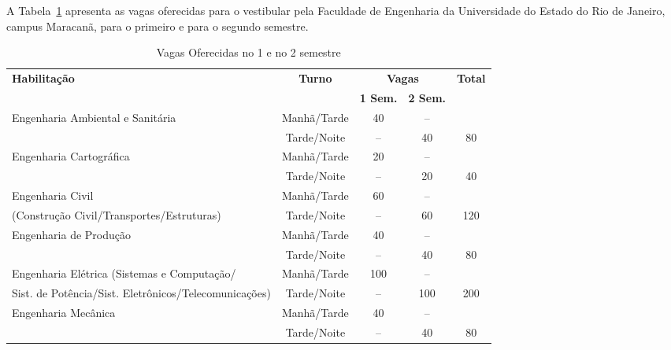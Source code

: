 A Tabela~\ref{tabvagas} apresenta as vagas oferecidas para o vestibular pela Faculdade de Engenharia da Universidade do Estado do Rio de Janeiro, campus Maracanã, para o primeiro e para o segundo semestre.
\setlength{\tabcolsep}{5pt}
\begin{table}
\centering
\caption{Vagas Oferecidas no 1\textordmasculine{} e no 2\textordmasculine{} semestre}
\label{tabvagas}
\renewcommand{\arraystretch}{1.5}
  \begin{tabularx}{\textwidth}{|X|c|c|c|c|}
	\hline
	\multirow{2}{*}{\textbf{Habilitação}}& \multirow{2}{*}{\textbf{Turno}} & \multicolumn{2}{c|}{\textbf{Vagas}} & \multirow{2}{*}{\textbf{Total}}\\
	\cline{3-4}& & \textbf{1\textordmasculine{} Sem.}                     & \textbf{2\textordmasculine{} Sem.}                &     \\
		\hline
		Engenharia Ambiental e Sanitária & Manhã/Tarde & 40 & --&     \\
		                                 & Tarde/Noite & -- & 40 & 80 \\
		\hline
		Engenharia Cartográfica          & Manhã/Tarde & 20 & -- &    \\
		                                 & Tarde/Noite & -- & 20 & 40 \\
		\hline
		Engenharia Civil                 & Manhã/Tarde & 60 & -- &    \\
		(Construção Civil/Transportes/Estruturas) & Tarde/Noite & -- & 60 & 120 \\
		\hline
		Engenharia de Produção           & Manhã/Tarde & 40 & --&     \\
		                                 & Tarde/Noite & -- & 40 & 80  \\
		\hline
		Engenharia Elétrica (Sistemas e Computação/ & Manhã/Tarde& 100 & --  &     \\
		Sist. de Potência/Sist. Eletrônicos/Telecomunicações) & Tarde/Noite & -- & 100  & 200 \\
		\hline
		Engenharia Mecânica              & Manhã/Tarde & 40 & -- &     \\
		                                 & Tarde/Noite & -- & 40 & 80  \\
		\hline
	\end{tabularx}
\end{table}
